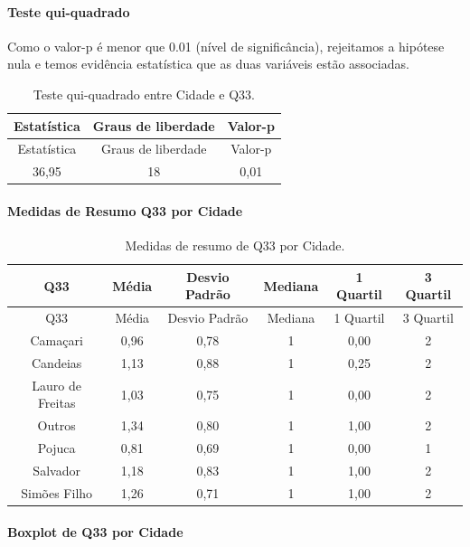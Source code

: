\documentclass[]{article}
\let\oldparagraph\paragraph
\renewcommand{\paragraph}[1]{\oldparagraph{#1}\mbox{}}
\begin{document}
\hypertarget{teste-qui-quadrado-97}{%
\paragraph{Teste qui-quadrado}\label{teste-qui-quadrado-97}}

Como o valor-p é menor que 0.01 (nível de significância), rejeitamos a hipótese nula e temos evidência estatística que as duas variáveis estão associadas.

\begin{longtable}[]{@{}ccc@{}}
\caption{\label{tab:unnamed-chunk-1136}Teste qui-quadrado entre Cidade e Q33.}\tabularnewline
\toprule
Estatística & Graus de liberdade & Valor-p\tabularnewline
\midrule
\endfirsthead
\toprule
Estatística & Graus de liberdade & Valor-p\tabularnewline
\midrule
\endhead
36,95 & 18 & 0,01\tabularnewline
\bottomrule
\end{longtable}

\cleardoublepage

\hypertarget{medidas-de-resumo-q33-por-cidade}{%
\paragraph{Medidas de Resumo Q33 por Cidade}\label{medidas-de-resumo-q33-por-cidade}}

\begin{longtable}[]{@{}cccccc@{}}
\caption{\label{tab:unnamed-chunk-1137}Medidas de resumo de Q33 por Cidade.}\tabularnewline
\toprule
Q33 & Média & Desvio Padrão & Mediana & 1 Quartil & 3 Quartil\tabularnewline
\midrule
\endfirsthead
\toprule
Q33 & Média & Desvio Padrão & Mediana & 1 Quartil & 3 Quartil\tabularnewline
\midrule
\endhead
Camaçari & 0,96 & 0,78 & 1 & 0,00 & 2\tabularnewline
Candeias & 1,13 & 0,88 & 1 & 0,25 & 2\tabularnewline
Lauro de Freitas & 1,03 & 0,75 & 1 & 0,00 & 2\tabularnewline
Outros & 1,34 & 0,80 & 1 & 1,00 & 2\tabularnewline
Pojuca & 0,81 & 0,69 & 1 & 0,00 & 1\tabularnewline
Salvador & 1,18 & 0,83 & 1 & 1,00 & 2\tabularnewline
Simões Filho & 1,26 & 0,71 & 1 & 1,00 & 2\tabularnewline
\bottomrule
\end{longtable}

\hypertarget{boxplot-de-q33-por-cidade}{%
\paragraph{Boxplot de Q33 por Cidade}\label{boxplot-de-q33-por-cidade}}
\end{document}

